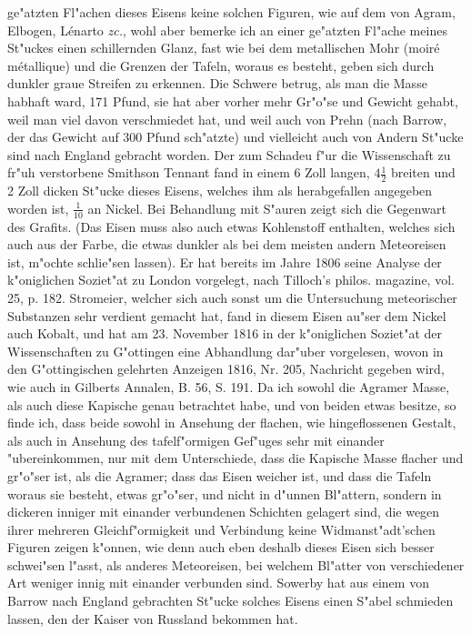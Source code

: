 \documentclass[a4paper, 11pt, oneside, polutonikogreek, german]{article}
\begin{document}
ge"atzten Fl"achen dieses Eisens keine solchen Figuren, wie auf dem von Agram, Elbogen, Lénarto \emph{zc.}, wohl aber bemerke ich an einer ge"atzten Fl"ache meines St"uckes einen schillernden Glanz, fast wie bei dem metallischen Mohr (moiré métallique) und die Grenzen der Tafeln, woraus es besteht, geben sich durch dunkler graue Streifen zu erkennen. Die Schwere betrug, als man die Masse habhaft ward, 171 Pfund, sie hat aber vorher mehr Gr"o"se und Gewicht gehabt, weil man viel davon verschmiedet hat, und weil auch von Prehn (nach Barrow, der das Gewicht auf 300 Pfund sch"atzte) und vielleicht auch von Andern St"ucke sind nach England gebracht worden. Der zum Schadeu f"ur die Wissenschaft zu fr"uh verstorbene Smithson Tennant fand in einem 6 Zoll langen, $\mathfrak{4\frac{1}{2}}$ breiten und 2 Zoll dicken St"ucke dieses Eisens, welches ihm als herabgefallen angegeben worden ist, $\mathfrak{\frac{1}{10}}$ an Nickel. Bei Behandlung mit S"auren zeigt sich die Gegenwart des Grafits. (Das Eisen muss also auch etwas Kohlenstoff enthalten, welches sich auch aus der Farbe, die etwas dunkler als bei dem meisten andern Meteoreisen ist, m"ochte schlie"sen lassen). Er hat bereits im Jahre 1806 seine Analyse der k"oniglichen Soziet"at zu London vorgelegt, nach Tilloch's philos. magazine, vol. 25, p. 182. Stromeier, welcher sich auch sonst um die Untersuchung meteorischer Substanzen sehr verdient gemacht hat, fand in diesem Eisen au"ser dem Nickel auch Kobalt, und hat am 23. November 1816 in der k"oniglichen Soziet"at der Wissenschaften zu G"ottingen eine Abhandlung dar"uber vorgelesen, wovon in den G"ottingischen gelehrten Anzeigen 1816, Nr. 205, Nachricht gegeben wird, wie auch in Gilberts Annalen, B. 56, S. 191. Da ich sowohl die Agramer Masse, als auch diese Kapische genau betrachtet habe, und von beiden etwas besitze, so finde ich, dass beide sowohl in Ansehung der flachen, wie hingeflossenen Gestalt, als auch in Ansehung des tafelf"ormigen Gef"uges sehr mit einander "ubereinkommen, nur mit dem Unterschiede, dass die Kapische Masse flacher und gr"o"ser ist, als die Agramer; dass das Eisen weicher ist, und dass die Tafeln woraus sie besteht, etwas gr"o"ser, und nicht in d"unnen Bl"attern, sondern in dickeren inniger mit einander verbundenen Schichten gelagert sind, die wegen ihrer mehreren Gleichf"ormigkeit und Verbindung keine Widmanst"adt'schen Figuren zeigen k"onnen, wie denn auch eben deshalb dieses Eisen sich besser schwei"sen l"asst, als anderes Meteoreisen, bei welchem Bl"atter von verschiedener Art weniger innig mit einander verbunden sind. Sowerby hat aus einem von Barrow nach England gebrachten St"ucke solches Eisens einen S"abel schmieden lassen, den der Kaiser von Russland bekommen hat.
\end{document}
